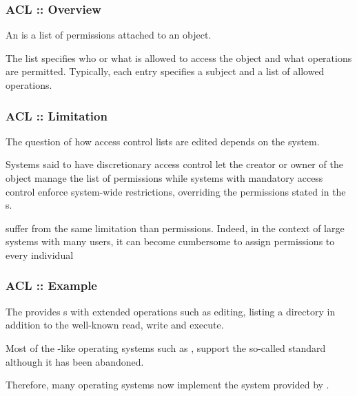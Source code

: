 
\begin{frame}
  \frametitle{ACL :: Overview}

  An  is a list of permissions
  attached to an object.

  \-

  The list specifies who or what is allowed to access the object and what
  operations are permitted. Typically, each  entry specifies a
  subject and a list of allowed operations.
\end{frame}


\begin{frame}
  \frametitle{ACL :: Limitation}

  The question of how access control lists are edited depends on the system.

  \-

  Systems said to have discretionary access control let the creator or owner
  of the object manage the list of permissions while systems with mandatory
  access control enforce system-wide restrictions, overriding the permissions
  stated in the s.

  \-

   suffer from the same limitation than  permissions.
  Indeed, in the context of large systems with many users, it can become
  cumbersome to assign permissions to every individual \etc{}
\end{frame}


\begin{frame}
  \frametitle{ACL :: Example}

  The  provides s with extended
  operations such as editing, listing a directory \etc{} in addition to the
  well-known read, write and execute.

  \-

  Most of the -like operating systems such as ,
   \etc{} support the so-called  standard although
  it has been abandoned.

  \-

  Therefore, many operating systems now implement the  system
  provided by  .
\end{frame}



